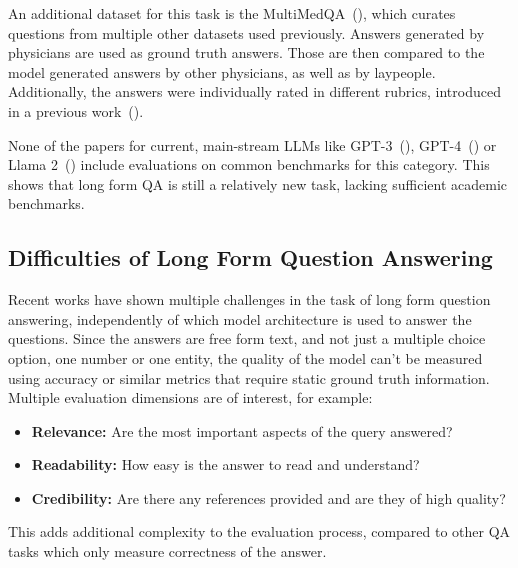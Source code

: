 An additional dataset for this task is the MultiMedQA~(\cite{singhal:2023:Towards}), which curates questions from multiple other datasets used previously. 
Answers generated by physicians are used as ground truth answers.
Those are then compared to the model generated answers by other physicians, as well as by laypeople.
Additionally, the answers were individually rated in different rubrics, introduced in a previous work~(\cite{singhal:2022:Large}).

None of the papers for current, main-stream LLMs like GPT-3~(\cite{brown:2020:Language}), GPT-4~(\cite{openai:2023:GPT}) or Llama 2~(\cite{touvron:2023:Llama}) include evaluations on common benchmarks for this category.
This shows that long form QA is still a relatively new task, lacking sufficient academic benchmarks.

\subsection{Difficulties of Long Form Question Answering}\label{sec:long-form-qa-difficulties}
Recent works have shown multiple challenges in the task of long form question answering, independently of which model architecture is used to answer the questions.
Since the answers are free form text, and not just a multiple choice option, one number or one entity, the quality of the model can't be measured using accuracy or similar metrics that require static ground truth information.
Multiple evaluation dimensions are of interest, for example:
\begin{itemize}
    \item \textbf{Relevance:} Are the most important aspects of the query answered?
    \item \textbf{Readability:} How easy is the answer to read and understand?
    \item \textbf{Credibility:} Are there any references provided and are they of high quality?
\end{itemize}
This adds additional complexity to the evaluation process, compared to other QA tasks which only measure correctness of the answer.



